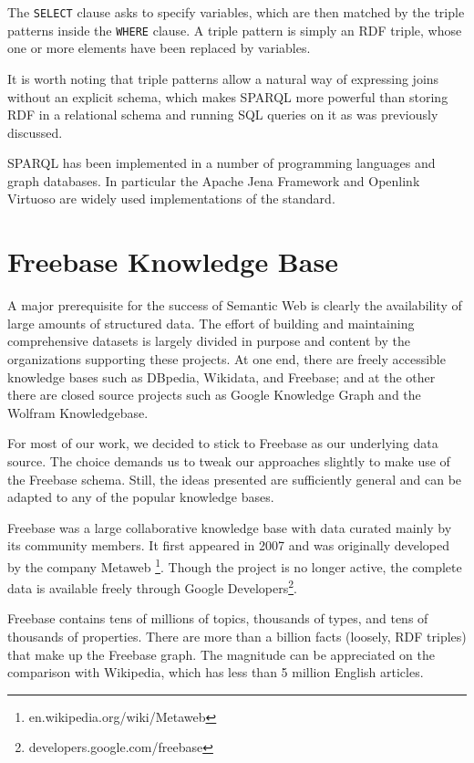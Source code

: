 \documentclass[a4paper, twoside, 12pt]{report}
\begin{document}
The \verb|SELECT| clause asks to specify variables, which are then matched by the triple patterns inside the \verb|WHERE| clause. A triple pattern is simply an RDF triple, whose one or more elements have been replaced by variables.

It is worth noting that triple patterns allow a natural way of expressing joins without an explicit schema, which makes SPARQL more powerful than storing RDF in a relational schema and running SQL queries on it as was previously discussed.

SPARQL has been implemented in a number of programming languages and graph databases. In particular the Apache Jena Framework \cite{jena2013apache} and Openlink Virtuoso \cite{erling2009rdf} are widely used implementations of the standard.

\section{Freebase Knowledge Base}

A major prerequisite for the success of Semantic Web is clearly the availability of large amounts of structured data. The effort of building and maintaining comprehensive datasets is largely divided in purpose and content by the organizations supporting these projects. At one end, there are freely accessible knowledge bases such as DBpedia, Wikidata, and Freebase; and at the other there are closed source projects such as Google Knowledge Graph and the Wolfram Knowledgebase.

For most of our work, we decided to stick to Freebase as our underlying data source. The choice demands us to tweak our approaches slightly to make use of the Freebase schema. Still, the ideas presented are sufficiently general and can be adapted to any of the popular knowledge bases.

Freebase was a large collaborative knowledge base with data curated mainly by its community members. It first appeared in 2007 and was originally developed by the company Metaweb \footnote{en.wikipedia.org/wiki/Metaweb}. Though the project is no longer active, the complete data is available freely through Google Developers\footnote{developers.google.com/freebase}.

Freebase contains tens of millions of topics, thousands of types, and tens of thousands of properties. There are more than a billion facts (loosely, RDF triples) that make up the Freebase graph. The magnitude can be appreciated on the comparison with Wikipedia, which has less than 5 million English articles.
\end{document}

